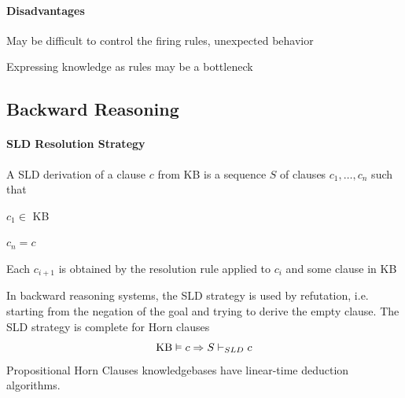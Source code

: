 \documentclass[10pt]{report}
\begin{document}
\paragraph{Disadvantages} \begin{list}{}{}
	\item May be difficult to control the firing rules, unexpected behavior
	\item Expressing knowledge as rules may be a bottleneck
\end{list}
\subsection{Backward Reasoning} 
\paragraph{SLD Resolution Strategy} A SLD derivation of a clause $c$ from KB is a sequence $S$ of clauses $c_1,\ldots,c_n$ such that
\begin{list}{}{}
	\item $c_1 \in$ KB
	\item $c_n = c$
	\item Each $c_{i+1}$ is obtained by the resolution rule applied to $c_i$ and some clause in KB
\end{list}
In backward reasoning systems, the SLD strategy is used by refutation, i.e. starting from the negation of the goal and trying to derive the empty clause. The SLD strategy is complete for Horn clauses $$\hbox{KB} \vDash c\Rightarrow S \vdash_{SLD} c$$
Propositional Horn Clauses knowledgebases have linear-time deduction algorithms.
\end{document}
